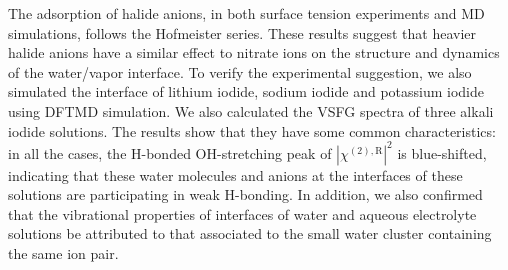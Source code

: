 The adsorption of halide anions, in both surface tension experiments and MD simulations, 
follows the Hofmeister series\cite{Jungwirth2006,Pegram2007,ZYJ10,Tobias2008,Parsons2011,HuaWei2013}.
These results suggest that heavier halide anions have a similar effect to nitrate ions on the structure and dynamics of the water/vapor interface. 
To verify the experimental suggestion, we also simulated the interface of lithium iodide, sodium iodide and potassium iodide  using DFTMD simulation.
We also calculated the VSFG spectra of three alkali iodide solutions. 
The results show that they have some common characteristics: in all the cases, 
the H-bonded OH-stretching peak of $|\chi^{(2),\text{R}}|^2$ is blue-shifted, 
indicating that these water molecules and anions at the interfaces of these solutions are participating in weak H-bonding.
In addition, we also confirmed that the vibrational properties of interfaces of water and aqueous electrolyte solutions be attributed to 
that associated to the small water cluster containing the same ion pair.

